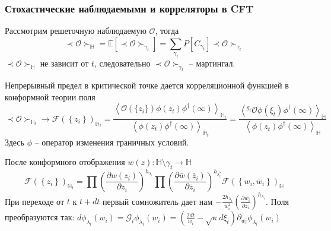 \documentclass[pdftex]{beamer}
\theoremstyle{definition} \newtheorem{Def}{Определение}
\begin{document}
\begin{frame}
  \frametitle{Стохастические наблюдаемыми и корреляторы в CFT}
  Рассмотрим решеточную наблюдаемую $\mathcal{O}$, тогда
  \begin{equation*}
    \prec \mathcal{O} \succ_{\mathbb{H}}=\mathbb{E}\left[\prec\mathcal{O}\succ_{\gamma_{t}}\right]=\sum_{\gamma_{t}} P\left[C_{\gamma_{t}}\right] \prec \mathcal{O} \succ_{\gamma_{t}}
  \end{equation*}
  $\prec \mathcal{O} \succ_{\mathbb{H}}$ не зависит от $t$, следовательно $\prec\mathcal{O}\succ_{\gamma_{t}}$ -- мартингал.

  Непрерывный предел в критической точке дается корреляционной функцией в конформной теории поля
  \begin{equation*}
    \prec \mathcal{O} \succ_{\mathbb{H}_{t}}\to \mathcal{F}(\left\{z_{i}\right\})_{\mathbb{H}_{t}}=
    \frac{\left< \mathcal{O}(\{z_{i}\})\phi(z_{t})\phi^{\dagger}(\infty)\right>_{\mathbb{H}_{t}}}{\left<\phi(z_{t})\phi^{\dagger}(\infty)\right>_{\mathbb{H}_{t}}}=
    \frac{\left< ^{g_{t}}\mathcal{O}\phi(\xi_{t})\phi^{\dagger}(\infty)\right>_{\mathbb{H}}}{\left<\phi(z_{t})\phi^{\dagger}(\infty)\right>_{\mathbb{H}}}
  \end{equation*}
  Здесь $\phi$ -- оператор изменения граничных условий.


  После конформного отображения $w(z):\mathbb{H}\setminus\gamma_{t}\to \mathbb{H}$
  \begin{equation*}
    \mathcal{F}(\left\{z_{i}\right\})_{\mathbb{H}_{t}}=\prod \left(\frac{\partial w(z_{i})}{\partial z_{i}}\right)^{h_{\lambda_i}} 
    \prod \left(\frac{\partial \bar w(\bar z_{i})}{\partial \bar z_{i}}\right)^{h_{\lambda^{*}_i}}
        \mathcal{F}(\left\{w_{i}, \bar w_{i}\right\})_{\mathbb{H}}
  \end{equation*}
  При переходе от  $t$ к $t+dt$ первый сомножитель дает нам $-\frac{2h_{\lambda_{i}}}{w_{i}^{2}}\left(\frac{\partial w_{i}}{\partial z_{i}}\right)^{h_{\lambda_{i}}}$. Поля преобразуются так:
$d\phi_{\lambda_{i}}(w_{i}) = \mathcal{G}_{i}\phi_{\lambda_{i}}(w_{i})=\left(\frac{2dt}{w_{i}}-\sqrt{\kappa} d\xi_{t}\right) \partial_{w_{i}}\phi_{\lambda_{i}}(w_{i})$
\end{frame}
\end{document}
